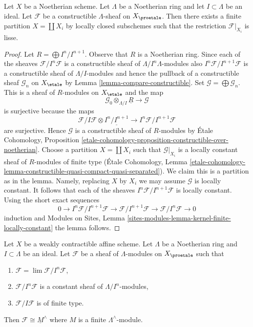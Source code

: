 \begin{lemma}
\label{lemma-Noetherian-constructible}
Let $X$ be a Noetherian scheme. Let $\Lambda$ be a Noetherian ring and
let $I \subset \Lambda$ be an ideal. Let $\mathcal{F}$ be a
constructible $\Lambda$-sheaf on $X_\proetale$.
Then there exists a finite partition $X = \coprod X_i$ by
locally closed subschemes such that the restriction $\mathcal{F}|_{X_i}$
is lisse.
\end{lemma}

\begin{proof}
Let $R = \bigoplus I^n/I^{n + 1}$. Observe that $R$ is a Noetherian ring.
Since each of the sheaves
$\mathcal{F}/I^n\mathcal{F}$ is a constructible sheaf of
$\Lambda/I^n\Lambda$-modules also $I^n\mathcal{F}/I^{n + 1}\mathcal{F}$
is a constructible sheaf of $\Lambda/I$-modules and hence the pullback
of a constructible sheaf $\mathcal{G}_n$ on $X_\etale$ by
Lemma \ref{lemma-compare-constructible}.
Set $\mathcal{G} = \bigoplus \mathcal{G}_n$. This is a sheaf
of $R$-modules on $X_\etale$ and the map
$$
\mathcal{G}_0 \otimes_{\Lambda/I} \underline{R}
\longrightarrow
\mathcal{G}
$$
is surjective because the maps
$$
\mathcal{F}/I\mathcal{F} \otimes \underline{I^n/I^{n + 1}} \to
I^n\mathcal{F}/I^{n + 1}\mathcal{F}
$$
are surjective. Hence $\mathcal{G}$ is a constructible sheaf of
$R$-modules by \'Etale Cohomology, Proposition
\ref{etale-cohomology-proposition-constructible-over-noetherian}.
Choose a partition $X = \coprod X_i$ such that
$\mathcal{G}|_{X_i}$ is a locally constant sheaf of $R$-modules
of finite type (\'Etale Cohomology, Lemma
\ref{etale-cohomology-lemma-constructible-quasi-compact-quasi-separated}).
We claim this is a partition as in the lemma.
Namely, replacing $X$ by $X_i$ we may assume $\mathcal{G}$ is locally
constant. It follows that each of the sheaves
 $I^n\mathcal{F}/I^{n + 1}\mathcal{F}$
is locally constant. Using the short exact sequences
$$
0 \to I^n\mathcal{F}/I^{n + 1}\mathcal{F} \to
\mathcal{F}/I^{n + 1}\mathcal{F} \to \mathcal{F}/I^n\mathcal{F} \to 0
$$
induction and Modules on Sites, Lemma
\ref{sites-modules-lemma-kernel-finite-locally-constant}
the lemma follows.
\end{proof}

\begin{lemma}
\label{lemma-weird}
Let $X$ be a weakly contractible affine scheme. Let $\Lambda$ be a Noetherian
ring and $I \subset \Lambda$ be an ideal. Let $\mathcal{F}$ be a sheaf of
$\Lambda$-modules on $X_\proetale$ such that
\begin{enumerate}
\item $\mathcal{F} = \lim \mathcal{F}/I^n\mathcal{F}$,
\item $\mathcal{F}/I^n\mathcal{F}$ is a constant sheaf of
$\Lambda/I^n$-modules,
\item $\mathcal{F}/I\mathcal{F}$ is of finite type.
\end{enumerate}
Then $\mathcal{F} \cong \underline{M}^\wedge$ where $M$ is
a finite $\Lambda^\wedge$-module.
\end{lemma}

